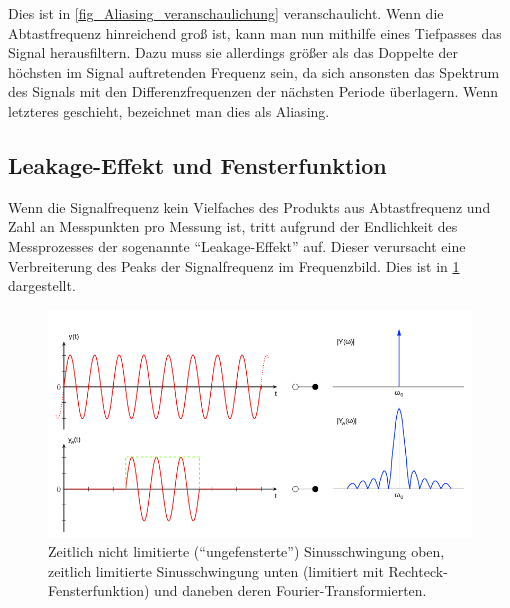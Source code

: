 \documentclass[
a4paper,
12pt,
pagesize,
ngerman
]{scrartcl}
\begin{document}
	\noindent Dies ist in \cref{fig_Aliasing_veranschaulichung} veranschaulicht.
	Wenn die Abtastfrequenz hinreichend groß ist, kann man nun mithilfe eines Tiefpasses das Signal herausfiltern.
	Dazu muss sie allerdings größer als das Doppelte der höchsten im Signal auftretenden Frequenz sein, da sich ansonsten das Spektrum des Signals mit den Differenzfrequenzen der nächsten Periode überlagern.
	Wenn letzteres geschieht, bezeichnet man dies als Aliasing.
		
	
	\subsection{Leakage-Effekt und Fensterfunktion}
	\label{leakage}
	Wenn die Signalfrequenz kein Vielfaches des Produkts aus Abtastfrequenz und Zahl an Messpunkten pro Messung ist, tritt aufgrund der Endlichkeit des Messprozesses der sogenannte \enquote{Leakage-Effekt} auf.
	Dieser verursacht eine Verbreiterung des Peaks der Signalfrequenz im Frequenzbild.
	Dies ist in \cref{fig_leakage_veranschaulichung} dargestellt.
	
	\begin{figure}[H]  
		\includegraphics[width=1\textwidth]{EIRE2018Dateien/sonstige_Dateien/leakage}
		\centering
		\caption{
			Zeitlich nicht limitierte (\enquote{ungefensterte}) Sinusschwingung oben, zeitlich limitierte Sinusschwingung unten (limitiert mit Rechteck-Fensterfunktion) und daneben deren Fourier-Transformierten.\cite{Leakage}
		}
		\label{fig_leakage_veranschaulichung}
		\centering
	\end{figure}
\end{document}
